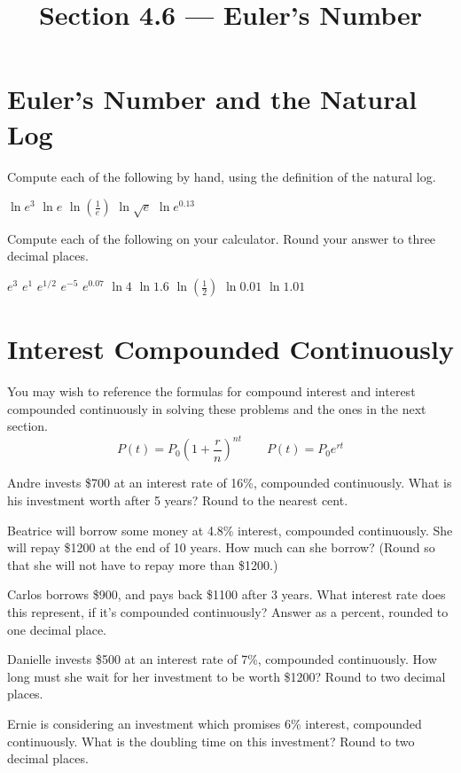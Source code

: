 

\title{Section 4.6 --- Euler's Number}


\maketitle

\section*{Euler's Number and the Natural Log}
Compute each of the following by hand, using the definition of the natural log.
\begin{smenum}
\mitemxxxxx
{$\ln e^3$}
{$\ln e$}
{$\ln\left(\frac{1}{e}\right)$}
{$\ln\sqrt{e}$}
{$\ln e^{0.13}$}
\end{smenum}
Compute each of the following on your calculator. Round your answer to three decimal places.
\begin{smenum}
\mitemxxxxx
{$e^3$}
{$e^1$}
{$e^{1/2}$}
{$e^{-5}$}
{$e^{0.07}$}
\mitemxxxxx
{$\ln 4$}
{$\ln 1.6$}
{$\ln\left(\frac{1}{2}\right)$}
{$\ln 0.01$}
{$\ln 1.01$}
\end{smenum}

\section*{Interest Compounded Continuously}
You may wish to reference the formulas for compound interest and interest compounded continuously in solving these problems and the ones in the next section.
$$P(t)=P_0\left(1+\frac{r}{n}\right)^{nt}
\qquad
P(t)=P_0e^{rt}$$
\begin{senum}
\item Andre invests \$700 at an interest rate of 16\%, compounded continuously. What is his investment worth after 5 years? Round to the nearest cent.
\item Beatrice will borrow some money at 4.8\% interest, compounded continuously. She will repay \$1200 at the end of 10 years. How much can she borrow? (Round so that she will not have to repay more than \$1200.)
\item Carlos borrows \$900, and pays back \$1100 after 3 years. What interest rate does this represent, if it's compounded continuously? Answer as a percent, rounded to one decimal place.
\item Danielle invests \$500 at an interest rate of 7\%, compounded continuously. How long must she wait for her investment to be worth \$1200? Round to two decimal places.
\item Ernie is considering an investment which promises 6\% interest, compounded continuously. What is the doubling time on this investment? Round to two decimal places.
\end{senum}

